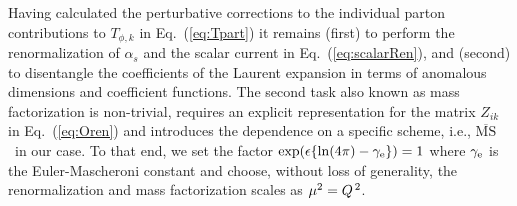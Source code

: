 \documentclass[12pt]{article}
\newcommand{\MSb}{$\overline{\mbox{MS}}$}
\newcommand{\ep}{\epsilon}
\begin{document}
Having calculated the perturbative corrections to the individual parton 
contributions to $T_{\phi, k}$ in Eq.~(\ref{eq:Tpart}) it remains (first) to 
perform the renormalization of $\alpha_s$ and the scalar current in 
Eq.~(\ref{eq:scalarRen}), and (second) to disentangle the coefficients of the 
Laurent expansion in terms of anomalous dimensions and coefficient functions.
The second task also known as mass factorization is non-trivial, requires 
an explicit representation for the matrix $Z_{ik}$ in Eq.~(\ref{eq:Oren}) 
and introduces the dependence on a specific scheme, i.e., \MSb\ in our case.
To that end, we set the factor $\exp ( \ep \{\ln(4\pi)-\gamma_{\rm e}\} ) = 1$ 
where $\gamma_{\rm e}$ is the Euler-Mascheroni constant and choose, without
loss of generality, the renormalization and mass factorization scales as 
$\mu^2 = {Q^{\, 2}}$.
\end{document}
